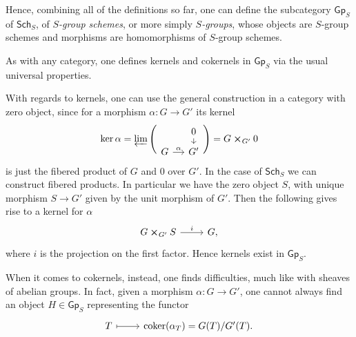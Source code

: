 \documentclass[../Main]{subfiles}
\begin{document}
\begin{defn}
	Hence, combining all of the definitions so far, 
	one can define the subcategory $\mathsf{Gp}_S$ of $\mathsf{Sch}_{ S }$,
	of {\em $S$-group schemes}, or more simply {\em $S$-groups},
	whose objects are $S$-group schemes
	and morphisms are homomorphisms of $S$-group schemes.
\end{defn}


\begin{rem}
	As with any category, one defines kernels and cokernels 
	in $\mathsf{Gp}_S$ via the usual universal properties.

	With regards to kernels, one can use the general construction 
	in a category with zero object,
	since for a morphism $\alpha\colon G \to G'$ its kernel
	\begin{equation*}
		\ker \alpha =
		\varprojlim \Bigg(
			\begin{tikzcd}[row sep=0.60em, column sep=1.2em]
			&
			0 \arrow[d, "", rightarrow] \\
			G \arrow[r, "\alpha", rightarrow] &
			G'
		\end{tikzcd} \Bigg)
		= G \cross_{G'} 0
	\end{equation*}
	is just the fibered product of $G$ and $0$ over $G'$.
	In the case of $\mathsf{Sch}_{ S }$ we can construct fibered products.
	In particular we have the zero object $S$, with unique morphism
	$S \to G'$ given by the unit morphism of $G'$.
	Then the following gives rise to a kernel for $\alpha$
	\begin{equation*}
	\begin{tikzcd}
		G \cross_{ G' } S \arrow[r, "i", rightarrow] &
		G,
	\end{tikzcd}
	\end{equation*} 
	where $i$ is the projection on the first factor.
	Hence kernels exist in $\mathsf{Gp}_S$.
	
	When it comes to cokernels, instead, one finds difficulties, much like
	with sheaves of abelian groups.
	In fact, given a morphism $\alpha\colon G \to G'$, one cannot always find an
	object $H \in \mathsf{Gp}_S$ representing the functor
	\begin{equation*}
	\begin{tikzcd}
		T \arrow[r, "", mapsto] &
		\coker (\alpha_T) =
		G(T)/G'(T).
	\end{tikzcd}
	\end{equation*}
\end{rem}
\end{document}
